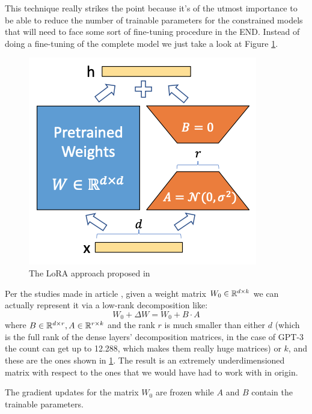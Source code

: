 This technique really strikes the point because it's of the utmost importance to be able to reduce
the number of trainable parameters for the constrained models that will need to face some sort of
fine-tuning procedure in the END. Instead of doing a fine-tuning of the complete model we just take
a look at Figure \ref{fig:lora}.
\begin{figure}
	\label{fig:lora}
	\includegraphics{figures/lora.png}
	\caption{The LoRA approach proposed in \cite{}}
\end{figure}
Per the studies made in article \cite{}, given a weight matrix $W_0 \in \mathbb{R}^{d \times k}$ we can
actually represent it via a low-rank decomposition like:
\begin{equation}
	W_0 + \Delta W = W_0 + B \cdot A
\end{equation}
where $B \in \mathbb{R}^{d \times r}, A \in \mathbb{R}^{r \times k}$ and the rank $r$ is much smaller than either
$d$ (which is the full rank of the dense layers' decomposition matrices, in the case of GPT-3 the
count can get up to 12.288, which makes them really huge matrices) or $k$, and these are the ones
shown in \ref{fig:lora}. The result is an extremely underdimensioned matrix with respect to the ones that we would have had to work with in origin.

The gradient updates for the matrix $W_0$ are frozen while $A$ and $B$ contain the trainable
parameters.

